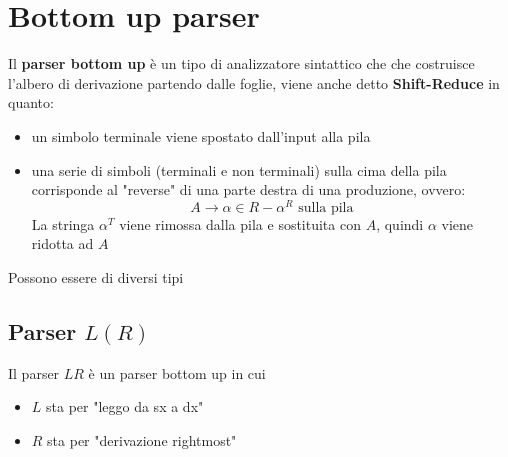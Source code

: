 \chapter{Bottom up parser}

Il \textbf{parser bottom up} è un tipo di analizzatore sintattico che che costruisce l'albero di derivazione partendo dalle foglie, viene anche detto \textbf{Shift-Reduce} in quanto:
\begin{itemize}
    \item un simbolo terminale viene spostato dall'input alla pila
    \item una serie di simboli (terminali e non terminali) sulla cima della pila corrisponde al "reverse" di una parte destra di una produzione, ovvero:
    \[
        A\to\alpha \in R - \alpha^R \text{ sulla pila}
    \]
    La stringa $\alpha^T$ viene rimossa dalla pila e sostituita con $A$, quindi $\alpha$ viene ridotta ad $A$
\end{itemize}
 
Possono essere di diversi tipi

\section{Parser $L(R)$}
Il parser $LR$ è un parser bottom up in cui
\begin{itemize}
    \item $L$ sta per "leggo da sx a dx"
    \item $R$ sta per "derivazione rightmost"
\end{itemize}

